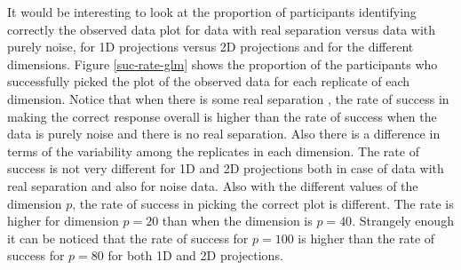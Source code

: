 \documentclass[12]{article}
\begin{document}
It would be interesting to look at the proportion of participants identifying correctly the observed data plot for data with real separation versus data with purely noise, for 1D projections versus 2D projections and for the different dimensions.
Figure \ref{suc-rate-glm} shows the proportion of the participants who successfully picked the plot of the observed data for each replicate of each dimension. Notice that when there is some real separation , the rate of success in making the correct response overall is higher than the rate of success when the data is purely noise and there is no real separation. Also there is a difference in terms of the variability among the replicates in each dimension.
 The rate of success is not very different for 1D and 2D projections both in case of data with real separation and also for noise data. %
Also with the different values of the dimension $p$, the rate of success in picking the correct plot is different. The rate is higher for dimension $p = 20$ than when the dimension is $p = 40$. Strangely enough it can be noticed that the rate of success for $p = 100$ is higher than the rate of success for $p=80$ for both 1D and 2D projections. 
\end{document}

